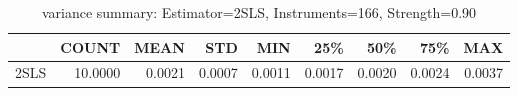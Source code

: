 \begin{table}[ht]
\centering
\caption{variance summary: Estimator=2SLS, Instruments=166, Strength=0.90}
\begin{tabular}{lrrrrrrrr}
\toprule
 & COUNT & MEAN & STD & MIN & 25\% & 50\% & 75\% & MAX \\
\midrule
2SLS & 10.0000 & 0.0021 & 0.0007 & 0.0011 & 0.0017 & 0.0020 & 0.0024 & 0.0037 \\
\bottomrule
\end{tabular}
\end{table}
